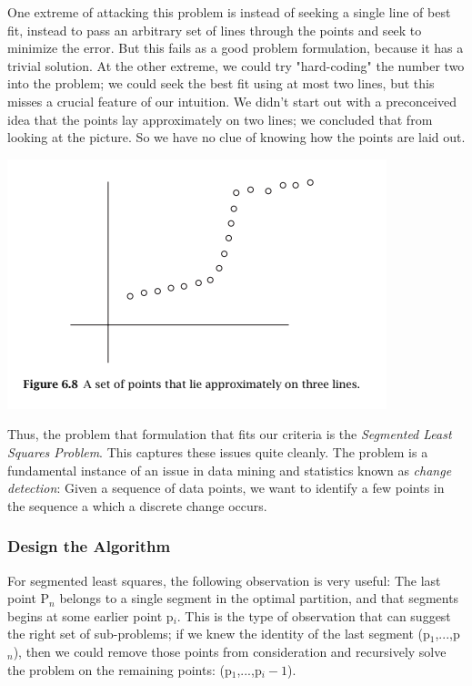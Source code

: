 \documentclass{article}
\begin{document}
One extreme of attacking this problem is instead of seeking a single line of best fit, instead to pass an arbitrary set of lines through the points and seek to minimize the error. But this fails as a good problem formulation, because it has a trivial solution. At the other extreme, we could try "hard-coding" the number two into the problem; we could seek the best fit using at most two lines, but this misses a crucial feature of our intuition. We didn't start out with a preconceived idea that the points lay approximately on two lines; we concluded that from looking at the picture. So we have no clue of knowing how the points are laid out.

\begin{center}
    \includegraphics[]{figures/fig13.png}
\end{center}

Thus, the problem that formulation that fits our criteria is the \emph{Segmented Least Squares Problem}. This captures these issues quite cleanly. The problem is a fundamental instance of an issue in data mining and statistics known as \emph{change detection}: Given a sequence of data points, we want to identify a few points in the sequence a which a discrete change occurs.\\

\subsubsection{Design the Algorithm}
For segmented least squares, the following observation is very useful: The last point P$_n$ belongs to a single segment in the optimal partition, and that segments begins at some earlier point p$_i$. This is the type of observation that can suggest the right set of sub-problems; if we knew the identity of the last segment (p$_1$,...,p$_n$), then we could remove those points from consideration and recursively solve the problem on the remaining points: (p$_1$,...,p$_i-1$).\\
\end{document}
